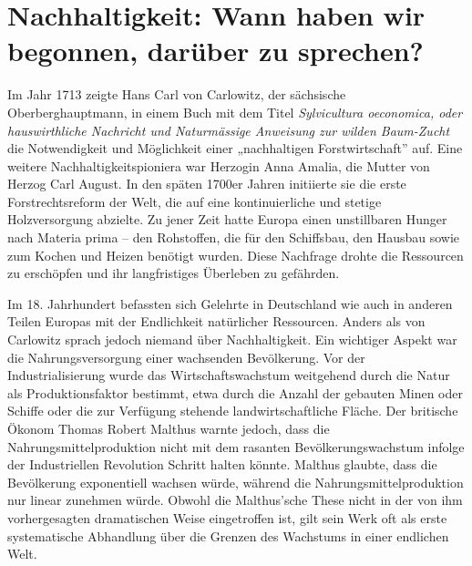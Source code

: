 \documentclass[
  nswissgerman,
  a4paper,
  DIV=11,
  numbers=noendperiod,
  oneside,
  openany]{scrreprt}
\begin{document}
\section{Nachhaltigkeit: Wann haben wir begonnen, darüber zu
sprechen?}\label{nachhaltigkeit-wann-haben-wir-begonnen-daruxfcber-zu-sprechen}

Im Jahr 1713 zeigte Hans Carl von Carlowitz, der sächsische
Oberberghauptmann, in einem Buch mit dem Titel \emph{Sylvicultura
oeconomica, oder hauswirthliche Nachricht und Naturmässige Anweisung zur
wilden Baum-Zucht} die Notwendigkeit und Möglichkeit einer „nachhaltigen
Forstwirtschaft'' auf. Eine weitere Nachhaltigkeitspioniera war Herzogin
Anna Amalia, die Mutter von Herzog Carl August. In den späten 1700er
Jahren initiierte sie die erste Forstrechtsreform der Welt, die auf eine
kontinuierliche und stetige Holzversorgung abzielte. Zu jener Zeit hatte
Europa einen unstillbaren Hunger nach Materia prima -- den Rohstoffen,
die für den Schiffsbau, den Hausbau sowie zum Kochen und Heizen benötigt
wurden. Diese Nachfrage drohte die Ressourcen zu erschöpfen und ihr
langfristiges Überleben zu gefährden.

Im 18. Jahrhundert befassten sich Gelehrte in Deutschland wie auch in
anderen Teilen Europas mit der Endlichkeit natürlicher Ressourcen.
Anders als von Carlowitz sprach jedoch niemand über Nachhaltigkeit. Ein
wichtiger Aspekt war die Nahrungsversorgung einer wachsenden
Bevölkerung. Vor der Industrialisierung wurde das Wirtschaftswachstum
weitgehend durch die Natur als Produktionsfaktor bestimmt, etwa durch
die Anzahl der gebauten Minen oder Schiffe oder die zur Verfügung
stehende landwirtschaftliche Fläche. Der britische Ökonom Thomas Robert
Malthus warnte jedoch, dass die Nahrungsmittelproduktion nicht mit dem
rasanten Bevölkerungswachstum infolge der Industriellen Revolution
Schritt halten könnte. Malthus glaubte, dass die Bevölkerung
exponentiell wachsen würde, während die Nahrungsmittelproduktion nur
linear zunehmen würde. Obwohl die Malthus'sche These nicht in der von
ihm vorhergesagten dramatischen Weise eingetroffen ist, gilt sein Werk
oft als erste systematische Abhandlung über die Grenzen des Wachstums in
einer endlichen Welt.
\end{document}
